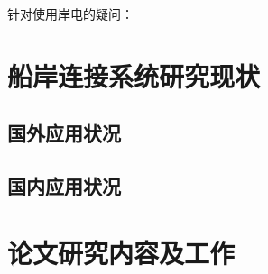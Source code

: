 针对使用岸电的疑问：




\section{船岸连接系统研究现状}

\subsection{国外应用状况}

\subsection{国内应用状况}

\section{论文研究内容及工作}

